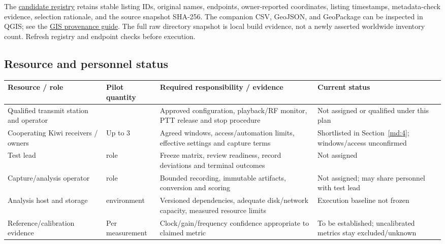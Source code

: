\documentclass[11pt,a4paper]{article}
\newlength{\tableavail}
\renewcommand{\arraystretch}{1.13}
\begin{document}
The \href{../../../rust/docs/../../docs/testing/data/kiwisdr-candidates.json}{candidate registry} retains stable listing IDs, original names, endpoints, owner-reported coordinates, listing timestamps, metadata-check evidence, selection rationale, and the source snapshot SHA-256. The companion CSV, GeoJSON, and GeoPackage can be inspected in QGIS; see the \href{../../../rust/docs/../../docs/testing/data/README.md}{GIS provenance guide}. The full raw directory snapshot is local build evidence, not a newly asserted worldwide inventory count. Refresh registry and endpoint checks before execution.


\subsection{Resource and personnel status}

\begin{landscape}\thispagestyle{plain}\centering
\setlength{\tabcolsep}{5pt}\renewcommand{\arraystretch}{1.25}
\setlength{\tableavail}{\dimexpr\linewidth-6\tabcolsep\relax}
\begin{adjustbox}{max totalsize={0.96\linewidth}{0.76\textheight},center}
\begin{tabular}{@{}>{\raggedright\arraybackslash}p{0.24\tableavail}>{\raggedright\arraybackslash}p{0.12\tableavail}>{\raggedright\arraybackslash}p{0.36\tableavail}>{\raggedright\arraybackslash}p{0.28\tableavail}@{}}
\toprule
\textbf{Resource / role} & \textbf{Pilot quantity} & \textbf{Required responsibility / evidence} & \textbf{Current status}\\
\midrule
Qualified transmit station and operator & 1 & Approved configuration, playback/RF monitor, PTT release and stop procedure & Not assigned or qualified under this plan\\[5pt]
Cooperating Kiwi receivers / owners & Up to 3 & Agreed windows, access/automation limits, effective settings and capture terms & Shortlisted in Section~\ref{md:4}; windows/access unconfirmed\\[5pt]
Test lead & 1 role & Freeze matrix, review readiness, record deviations and terminal outcomes & Not assigned\\[5pt]
Capture/analysis operator & 1 role & Bounded recording, immutable artifacts, conversion and scoring & Not assigned; may share personnel with test lead\\[5pt]
Analysis host and storage & 1 environment & Versioned dependencies, adequate disk/network capacity, measured resource limits & Execution baseline not frozen\\[5pt]
Reference/calibration evidence & Per measurement & Clock/gain/frequency confidence appropriate to claimed metric & To be established; uncalibrated metrics stay excluded/unknown\\[5pt]
\bottomrule
\end{tabular}
\end{adjustbox}
\end{landscape}
\end{document}
